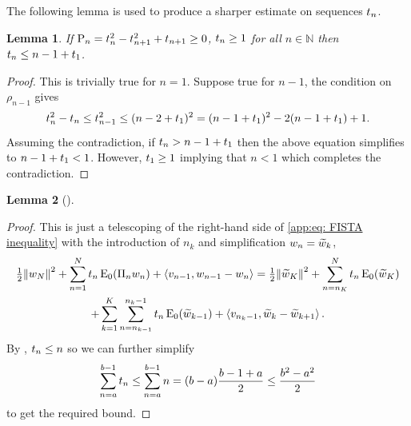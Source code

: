 \documentclass[10pt,a4paper,onecolumn]{article}
\numberwithin{equation}{section}
\newtheorem{lemma}{Lemma}[section]\newtheorem{example}{Example}[section]
\let\F\mathds\let\C\mathcal\newcommand{\R}{\F{R}}\newcommand{\A}{\C{A}}
\newcommand{\norm}[1]{{\left\lVert #1 \right\rVert}}
\newcommand{\IP}[2]{\left\langle #1,#2 \right\rangle}\newcommand{\ip}[2]{#1 \vcenter{\hbox{\resizebox{6pt}{!}{\ensuremath\cdot}}} #2}
\newcommand{\op}[1]{\operatorname{#1}}\newcommand{\overtext}[2]{\stackrel{\text{#1}}{#2}}
\newcommand*{\Func}[1]{%
	\IfEqCase{#1}{%
		{0}{\op{E}}%
		{1}{\op{F}}%
		{2}{\op{G}}%
		{3}{\op{H}}%
	}[\op{F}#1]%
}
\newcommand*{\varf}[1]{%
	\IfEqCase{#1}{%
		{0}{u}%
		{1}{v}%
		{2}{w}%
	}[u#1]%
}
\newcommand*{\vart}[1]{%
	\IfEqCase{#1}{%
		{0}{s}%
		{1}{t}%
	}[t#1]%
}
\newcommand*{\vars}[1]{%
	\IfEqCase{#1}{%
		{0}{\alpha}%
		{1}{\beta}%
		{2}{\gamma}%
		{3}{a}%
		{4}{b}%
		{5}{c}%
	}[k#1]%
}
\begin{document}
\newpage\noindent The following lemma is used to produce a sharper estimate on sequences $\vart1_n$.
\begin{lemma}\label{app: tn upper bound}
	If $\rho_n=\vart1_{n}^2-\vart1_{n+1}^2+\vart1_{n+1}\geq0$, $\vart1_n\geq 1$ for all $n\in\F N$ then $\vart1_n\leq n-1 +\vart1_1$.
\end{lemma}
\begin{proof}
	This is trivially true for $n=1$. Suppose true for $n-1$, the condition on $\rho_{n-1}$ gives
	\begin{equation}
		\vart1_n^2 -\vart1_n \leq \vart1_{n-1}^2 \leq (n-2+\vart1_1)^2 = (n-1+\vart1_1)^2 -2(n-1+\vart1_1) + 1.
	\end{equation}
	Assuming the contradiction, if $\vart1_n> n-1+\vart1_1$ then the above equation simplifies to $n-1+\vart1_1 < 1$. However, $\vart1_1\geq 1$ implying that $n<1$ which completes the contradiction.
\end{proof}



\begin{lemma}[]\label{app:thm: mini exponential FISTA convergence}
\end{lemma}
\begin{proof}
	This is just a telescoping of the right-hand side of \eqref{app:eq: FISTA inequality} with the introduction of $n_k$ and simplification $\varf2_n = \tilde{\varf2}_k$,
	\begin{multline}
		\tfrac12\norm{\varf2_N}^2 + \sum^N_{n=1} \vart1_n\Func0_0(\Pi_n\varf2_n) + \IP{\varf1_{n-1}}{\varf2_{n-1}-\varf2_n} = \tfrac12\norm{\tilde{\varf2}_K}^2 + \sum_{n=n_K}^N\vart1_n\Func0_0(\tilde{\varf2}_K) 
		\\+ \sum_{k=1}^K\sum_{n=n_{k-1}}^{n_k-1}\vart1_n\Func0_0(\tilde{\varf2}_{k-1}) 
		+ \IP{\varf1_{n_k-1}}{\tilde{\varf2}_k-\tilde{\varf2}_{k+1}}.
	\end{multline}
	By , $\vart1_n\leq n$ so we can further simplify
	$$\sum_{n=\vars3}^{\vars4-1}\vart1_n \leq \sum_{n=\vars3}^{\vars4-1}n = (\vars4-\vars3)\frac{\vars4-1+\vars3}{2} \leq \frac{\vars4^2-\vars3^2}{2}$$
	to get the required bound.
\end{proof}
\end{document}
